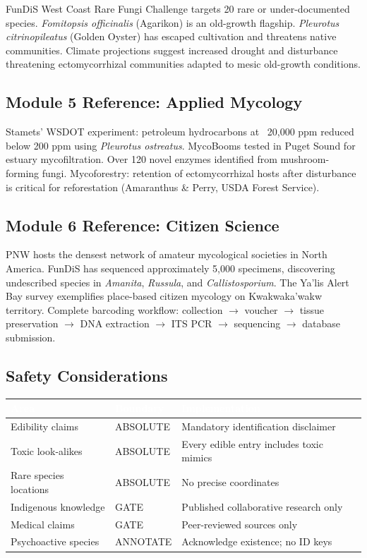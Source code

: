 \documentclass[11pt,letterpaper]{article}
\newcommand{\tableheader}[1]{\textbf{\sffamily\textcolor{white}{#1}}}
\begin{document}
FunDiS West Coast Rare Fungi Challenge targets 20 rare or under-documented species. \textit{Fomitopsis officinalis} (Agarikon) is an old-growth flagship. \textit{Pleurotus citrinopileatus} (Golden Oyster) has escaped cultivation and threatens native communities. Climate projections suggest increased drought and disturbance threatening ectomycorrhizal communities adapted to mesic old-growth conditions.

\subsection{Module 5 Reference: Applied Mycology}

Stamets' WSDOT experiment: petroleum hydrocarbons at ~20,000 ppm reduced below 200 ppm using \textit{Pleurotus ostreatus}. MycoBooms tested in Puget Sound for estuary mycofiltration. Over 120 novel enzymes identified from mushroom-forming fungi. Mycoforestry: retention of ectomycorrhizal hosts after disturbance is critical for reforestation (Amaranthus \& Perry, USDA Forest Service).

\subsection{Module 6 Reference: Citizen Science}

PNW hosts the densest network of amateur mycological societies in North America. FunDiS has sequenced approximately 5,000 specimens, discovering undescribed species in \textit{Amanita}, \textit{Russula}, and \textit{Callistosporium}. The Ya'lis Alert Bay survey exemplifies place-based citizen mycology on Kwakwaka'wakw territory. Complete barcoding workflow: collection $\rightarrow$ voucher $\rightarrow$ tissue preservation $\rightarrow$ DNA extraction $\rightarrow$ ITS PCR $\rightarrow$ sequencing $\rightarrow$ database submission.

\subsection{Safety Considerations}

\begin{center}
\begin{tabularx}{\textwidth}{L{3cm}L{2cm}X}
\toprule
{}
\tableheader{Area} & \tableheader{Boundary} & \tableheader{Implementation} \\
\midrule
Edibility claims & ABSOLUTE & Mandatory identification disclaimer \\
Toxic look-alikes & ABSOLUTE & Every edible entry includes toxic mimics \\
Rare species locations & ABSOLUTE & No precise coordinates \\
Indigenous knowledge & GATE & Published collaborative research only \\
Medical claims & GATE & Peer-reviewed sources only \\
Psychoactive species & ANNOTATE & Acknowledge existence; no ID keys \\
\bottomrule
\end{tabularx}
\end{center}
\end{document}
